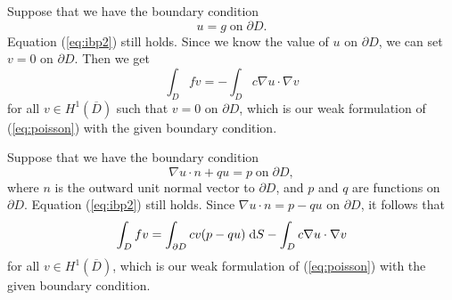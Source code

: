 \documentclass{homework}
\begin{document}
	\begin{alphaparts}
		\questionpart Suppose that we have the boundary condition
		\begin{equation}
			u = g \;\text{on}\;\partial D.
		\end{equation}
		Equation (\ref{eq:ibp2}) still holds. Since we know the value of $u$ on $\partial D$, we can set $v = 0$ on $\partial D$. Then we get
		\begin{equation}
			\int_D fv = - \int_D c\nabla u\cdot \nabla v
		\end{equation}
		for all $v \in H^1\left(\overline{D}\right)$ such that $v = 0$ on $\partial D$, which is our weak formulation of (\ref{eq:poisson}) with the given boundary condition.
		
		\questionpart Suppose that we have the boundary condition
		\begin{equation}
			\nabla u\cdot n + qu = p \;\text{on}\;\partial D,
		\end{equation}
		where $n$ is the outward unit normal vector to $\partial D$, and $p$ and $q$ are functions on $\partial D$. Equation (\ref{eq:ibp2}) still holds. Since $\nabla u \cdot n = p - qu$ on $\partial D$, it follows that
		\begin{equation}
			\int_D fv = \int_{\partial D} cv(p-qu)\;\text{d} S - \int_D c\nabla u\cdot\nabla v
		\end{equation}
		for all $v \in H^1\left(\overline{D}\right)$, which is our weak formulation of (\ref{eq:poisson}) with the given boundary condition.
	\end{alphaparts}
	
\end{document}
